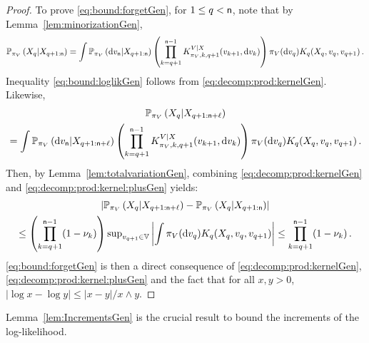 \begin{proof}
To prove \eqref{eq:bound:forgetGen}, for $1\le q< {\mathsf n}$, note that by Lemma~\ref{lem:minorizationGen},  
\begin{equation}
\label{eq:decomp:prod:kernelGen}
\bP_{\pi_V}\pa{X_{q}\middle|X_{q+1:\nobs}} = \int \bP_{\pi_V}\pa{\rmd v_{\nobs}\middle | X_{q+1:\nobs}} \pa{\prod_{k =q+1}^{\nobs-1}K^{V|X}_{\pi_V,k,q+1}(v_{k+1},\rmd v_k)}\pi_V(\rmd v_q)K_{q}(X_q,v_q,v_{q+1})\eqsp.
\end{equation}
Inequality \eqref{eq:bound:loglikGen} follows from \eqref{eq:decomp:prod:kernelGen}.  Likewise,
\begin{multline}
\label{eq:decomp:prod:kernel:plusGen}
\bP_{\pi_V}\pa{X_{q}\middle|X_{q+1:\nobs+\ell}} \\
= \int \bP_{\pi_V}\pa{\rmd v_{\nobs}\middle | X_{q+1:\nobs+\ell}} \pa{\prod_{k =q+1}^{\nobs-1}K^{V|X}_{\pi_V,k,q+1}(v_{k+1},\rmd v_k)}\pi_V(\rmd v_q)K_{q}(X_q,v_q,v_{q+1})\eqsp.
\end{multline}
Then, by Lemma~\ref{lem:totalvariationGen}, combining \eqref{eq:decomp:prod:kernelGen} and \eqref{eq:decomp:prod:kernel:plusGen} yields:
\begin{multline*}
\absj{\bP_{\pi_V}\pa{X_{q}\middle|X_{q+1:\nobs+\ell}}-  \bP_{\pi_V}\pa{X_{q}\middle|X_{q+1:\nobs}}}\\
\leq \pa{\prod_{k=q+1}^{\nobs-1}(1-\nu_k)} \sup_{v_{q+1}\in\Vset}\absj{\int\pi_V(\rmd v_q)K_{q}(X_q,v_q,v_{q+1})}
\le\prod_{k=q+1}^{\nobs-1}(1-\nu_k)\eqsp.
\end{multline*}
\eqref{eq:bound:forgetGen} is then a direct consequence of \eqref{eq:decomp:prod:kernelGen}, \eqref{eq:decomp:prod:kernel:plusGen} and the fact that 
for all $x,y>0$, $|\log x - \log y| \le |x-y|/x\wedge y$.  
\end{proof}



\noindent
Lemma~\ref{lem:IncrementsGen} is the crucial result to bound the increments of the log-likelihood.



